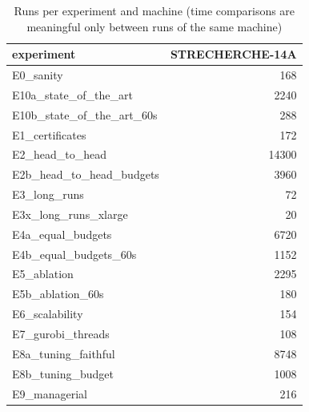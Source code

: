 \begin{table}[htbp]
\centering
\small
\caption{Runs per experiment and machine (time comparisons are meaningful only between runs of the same machine)}
\label{tab:campaign_hosts}
\begin{tabular}{lr}
\toprule
experiment & STRECHERCHE-14A \\
\midrule
E0\_sanity & 168 \\
E10a\_state\_of\_the\_art & 2240 \\
E10b\_state\_of\_the\_art\_60s & 288 \\
E1\_certificates & 172 \\
E2\_head\_to\_head & 14300 \\
E2b\_head\_to\_head\_budgets & 3960 \\
E3\_long\_runs & 72 \\
E3x\_long\_runs\_xlarge & 20 \\
E4a\_equal\_budgets & 6720 \\
E4b\_equal\_budgets\_60s & 1152 \\
E5\_ablation & 2295 \\
E5b\_ablation\_60s & 180 \\
E6\_scalability & 154 \\
E7\_gurobi\_threads & 108 \\
E8a\_tuning\_faithful & 8748 \\
E8b\_tuning\_budget & 1008 \\
E9\_managerial & 216 \\
\bottomrule
\end{tabular}
\end{table}
